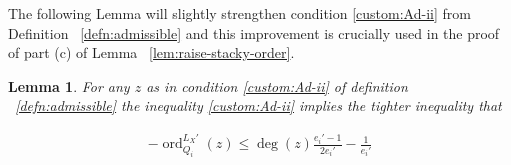 \documentclass{amsart}
\theoremstyle{plain}
\newtheorem{lem}[thm]{Lemma}
\theoremstyle{definition}
\theoremstyle{remark}
\numberwithin{equation}{section}
\newcommand\BN{{\mathbb N}}
\DeclareMathOperator{\ord}{ord}
\newcommand\sx{\mathscr X}
\newcommand \subhalf[1]{\frac{{#1} - 1}{2{#1}}}
\newcommand{\halfcan}{L}
\begin{document}
%

The following Lemma will slightly strengthen condition \ref{custom:Ad-ii} from Definition ~\ref{defn:admissible} and this improvement is crucially used in the proof of part (c) of Lemma ~\ref{lem:raise-stacky-order}.

\begin{lem}
\label{lem:admissible_inequality}
For any $z$ as in condition \ref{custom:Ad-ii} of definition ~\ref{defn:admissible} the inequality \ref{custom:Ad-ii} implies the
tighter inequality that

\begin{align*}
	-\ord_{Q_i}
^{\halfcan_X'}(z) \leq \deg(z) \subhalf{e_i'} -\frac{1}{e_i'}
\end{align*}
\end{lem}
\end{document}
